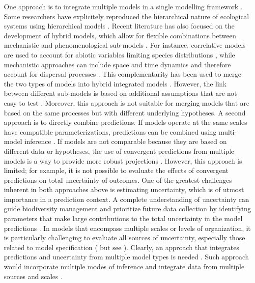 One approach is to integrate multiple models in a single modelling framework \citep{Buckley2010}. 
Some researchers have explicitely reproduced the hierarchical nature of ecological systems using hierarchical models \citep[e.g.][]{Royale2008, Catterall2012, Strigul2012, Stewart-Koster2013, Soranno2014}. 
Recent literature has also focused on the development of hybrid models, which allow for flexible combinations between mechanistic and phenomenological sub-models \citep{Gallien2010, Franklin2010, Thuiller2013}. 
For instance, correlative models are used to account for abiotic variables limiting species distributions \citep{Guisan2005}, while mechanistic approaches can include space and time dynamics and therefore account for dispersal processes \citep{Kearney2008}. 
This complementarity has been used to merge the two types of models into hybrid integrated models \citep[e.g.][]{Keith2008, Anderson2009, Smolik2010, Boulangeat2014}. 
However, the link between different sub-models is based on additional assumptions that are not easy to test \citep{Gallien2010}. 
Moreover, this approach is not suitable for merging models that are based on the same processes but with different underlying hypotheses.
A second approach is to directly combine predictions.
If models operate at the same scales have compatible parameterizations, predictions can be combined using multi-model inference \citep[e.g., model averaging, ensemble forecasting][]{Araujo2007, Diniz-Filho2009}. 
If models are not comparable because they are based on different data or hypotheses, the use of convergent predictions from multiple models is a way to provide more robust projections \citep{Morin2009, Marmion2009, Serra-Diaz2013}.
However, this approach is limited; for example, it is not possible to evaluate the effects of convergent predictions on total uncertainty of outcomes.
One of the greatest challenges inherent in both approaches above is estimating uncertainty, which is of utmost importance in a prediction context.
A complete understanding of uncertainty can guide biodiversity management and prioritize future data collection by identifying parameters that make large contributions to the total uncertainty in the model predictions \citep{McMahon2011}. 
In models that encompass multiple scales or levels of organization, it is particularly challenging to evaluate all sources of uncertainty, especially those related to model specification (\citealt{Calder2003} but see \citealt{Conlisk2013}).
Clearly, an approach that integrates predictions and uncertainty from multiple model types is needed \citep{Beck2012, Thuiller2013}. 
Such approach would incorporate multiple modes of inference and integrate data from multiple sources and scales \citep{Levin1992, Peters2004, Thuiller2013}.

